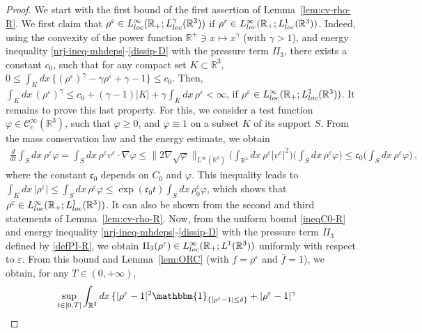 \documentclass[10pt,a4paper]{amsart}
\def \R{{\mathbb{R}}}
\begin{document}
\begin{proof}
  We start with the first bound of the first assertion of Lemma~\ref{lem:cv-rho-R}. We first claim that $\rho^\varepsilon \in L_{\rm loc}^\infty(\R_+; L_{\rm loc}^\gamma(\R^3))$ if  $\rho^\varepsilon \in L_{\rm loc}^\infty(\R_+; L_{\rm loc}^1(\R^3))$. Indeed, using the convexity of the power function $\R^+\ni x\mapsto x^\gamma$ (with $\gamma >1$), and energy inequality \eqref{nrj-ineq-mhdeps}-\eqref{dissip-D} with the pressure term $\Pi_3$, there exists a constant $ c_0$, such that for any compact set $K\subset \R^3$, $0\leq \int_{K}dx \,\{ (\rho^\varepsilon)^\gamma - \gamma \rho^\varepsilon +\gamma -1 \}\leq  c_0$. Then, $ \int_{K}dx \,(\rho^\varepsilon)^\gamma \leq  c_0 + (\gamma-1)|K|+\gamma \int_{K}dx \,\rho^\varepsilon <\infty$, if  $\rho^\varepsilon \in L_{\rm loc}^\infty(\R_+; L_{\rm loc}^1(\R^3))$. It remains to prove this last property. For this, we consider a test function $\varphi \in \mathscr{C}_c^\infty(\R^3)$, such that $\varphi \geq 0$, and $\varphi \equiv 1$ on a subset $ K $ of its support $ S $. From the mass conservation law and the energy estimate, we obtain
\begin{align*}
  \frac{d}{dt} \int_{S} dx \, \rho^\varepsilon  \varphi  =
  \int_S dx\, \rho^\varepsilon v^\varepsilon \cdot \nabla \varphi 
   \leq \| 2 \nabla \sqrt{\varphi}\|_{L^\infty(\R^3)}\bigg(\int_{\R^3}dx\, \rho^\varepsilon |v^\varepsilon|^2\bigg)
  \bigg(\int_{S}dx\, \rho^\varepsilon \varphi \bigg) \leq \mathfrak c_0
  \bigg(\int_{S} dx\,\rho^\varepsilon \varphi\bigg) \,,
\end{align*}
where the constant $\mathfrak c_0$ depends on $C_0$ and $\varphi$. This inequality leads to $ \int_{K} dx\, |\rho^\varepsilon| \leq \int_{S} dx\, \rho^\varepsilon \varphi \leq \exp(\mathfrak c_0 t)\int_{S} dx\, \rho_0^\varepsilon \varphi $, which shows that $\rho^\varepsilon \in L_{\rm loc}^\infty(\R_+; L_{\rm loc}^1(\R^3))$. It can also be shown from the second and third statements of  Lemma~\ref{lem:cv-rho-R}. Now, from the uniform bound \eqref{ineqC0-R} and energy inequality \eqref{nrj-ineq-mhdeps}-\eqref{dissip-D} with the pressure term $\Pi_3$ defined by \eqref{defPI-R}, we obtain $\Pi_3(\rho^\varepsilon) \in L_{\rm loc}^\infty(\R_+;L^1(\R^3))$ uniformly with respect to $\varepsilon$. From this bound and Lemma~\ref{lem:ORC} (with $f=\rho^\varepsilon$ and $\bar f=1$), we obtain, for any $T\in (0,+\infty)$,
\begin{align}
  \label{eqn:bdze}
 &\sup_{t\in[0,T]}  \int_{\R^3}dx \,\{ |\rho^\varepsilon-1|^2
\mathbbm{1}_{\{|\rho^\varepsilon-1|\leq \delta\}} + |\rho^\varepsilon-1|^\gamma

\end{align}
\end{proof}
\end{document}
